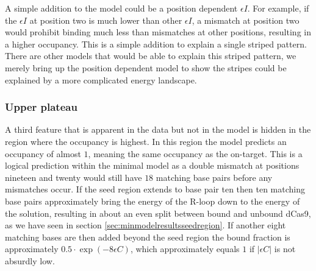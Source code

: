 A simple addition to the model could be a position dependent $\epsilon I$. For example, if the $\epsilon I$ at position two is much lower than other $\epsilon I$, a mismatch at position two would prohibit binding much less than mismatches at other positions, resulting in a higher occupancy. This is a simple addition to explain a single striped pattern. There are other models that would be able to explain this striped pattern, we merely bring up the position dependent model to show the stripes could be explained by a more complicated energy landscape.


\subsubsection{Upper plateau}

A third feature that is apparent in the data but not in the model is hidden in the region where the occupancy is highest. In this region the model predicts an occupancy of almost $1$, meaning the same occupancy as the on-target. This is a logical prediction within the minimal model as a double mismatch at positions nineteen and twenty would still have $18$ matching base pairs before any mismatches occur. If the seed region extends to base pair ten then ten matching base pairs approximately bring the energy of the R-loop down to the energy of the solution, resulting in about an even split between bound and unbound dCas9, as we have seen in section \ref{sec:minmodelresultsseedregion}. If another eight matching bases are then added beyond the seed region the bound fraction is approximately $0.5 \cdot \exp(-8\epsilon C)$, which approximately equals $1$ if $|\epsilon C|$ is not absurdly low.

